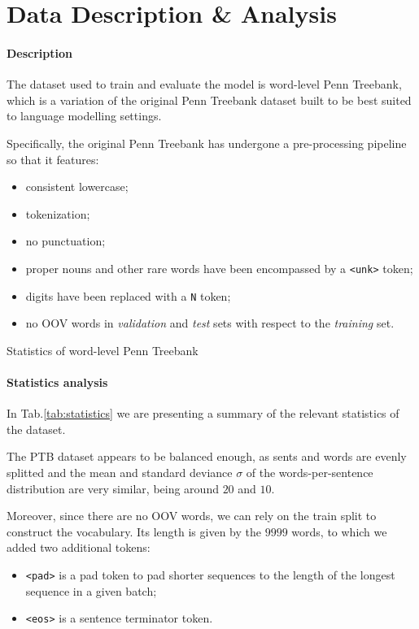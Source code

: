 \section{Data Description \& Analysis}
\label{sec:3_data}
\paragraph*{Description}
The dataset used to train and evaluate the model is word-level Penn Treebank\cite{marcus1993building}, which is a variation of the original Penn Treebank dataset built to be best suited to language modelling settings. 

Specifically, the original Penn Treebank has undergone a pre-processing pipeline so that it features:

\begin{itemize}
    \item consistent lowercase;
    \item tokenization;
    \item no punctuation;
    \item proper nouns and other rare words have been encompassed by a \texttt{<unk>} token;
    \item digits have been replaced with a \texttt{N} token;
    \item no OOV words in \emph{validation} and \emph{test} sets with respect to the \emph{training} set.
\end{itemize}

\begin{table}
    
    \caption{Statistics of word-level Penn Treebank}
    \label{tab:statistics}
\end{table}

\paragraph*{Statistics analysis}
In Tab.\ref{tab:statistics} we are presenting a summary of the relevant statistics of the dataset.

The PTB dataset appears to be balanced enough, as sents and words are evenly splitted and the mean and standard deviance \(\sigma\) of the words-per-sentence distribution are very similar, being around \(20\) and \(10\).

Moreover, since there are no OOV words, we can rely on the train split to construct the vocabulary. Its length is given by the \(9999\) words, to which we added two additional tokens:
\begin{itemize}
    \item \texttt{<pad>} is a pad token to pad shorter sequences to the length of the longest sequence in a given batch;
    \item \texttt{<eos>} is a sentence terminator token.
\end{itemize}


